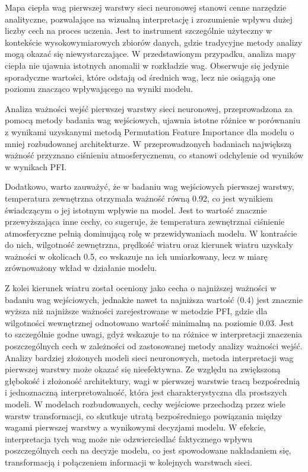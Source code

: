 \documentclass[a4paper,twoside,12pt]{book}
\begin{document}
Mapa ciepła wag pierwszej warstwy sieci neuronowej stanowi cenne narzędzie analityczne, pozwalające na wizualną interpretację i zrozumienie wpływu dużej liczby cech na proces uczenia. Jest to instrument szczególnie użyteczny w kontekście wysokowymiarowych zbiorów danych, gdzie tradycyjne metody analizy mogą okazać się niewystarczające. W przedstawionym przypadku, analiza mapy ciepła nie ujawnia istotnych anomalii w rozkładzie wag. Obserwuje się jedynie sporadyczne wartości, które odstają od średnich wag, lecz nie osiągają one poziomu znacząco wpływającego na wyniki modelu.

Analiza ważności wejść pierwszej warstwy sieci neuronowej, przeprowadzona za pomocą metody badania wag wejściowych, ujawnia istotne różnice w porównaniu z wynikami uzyskanymi metodą Permutation Feature Importance dla modelu o mniej rozbudowanej architekturze. W przeprowadzonych badaniach największą ważność przyznano ciśnieniu atmosferycznemu, co stanowi odchylenie od wyników w wynikach PFI.

Dodatkowo, warto zauważyć, że w badaniu wag wejściowych pierwszej warstwy, temperatura zewnętrzna otrzymała ważność równą 0.92, co jest wynikiem świadczącym o jej istotnym wpływie na model. Jest to wartość znacznie przewyższająca inne cechy, co sugeruje, że temperatura zewnętrznai ciśnienie atmosferyczne pełnią dominującą rolę w przewidywaniach modelu. W kontraście do nich, wilgotność zewnętrzna, prędkość wiatru oraz kierunek wiatru uzyskały ważności w okolicach 0.5, co wskazuje na ich umiarkowany, lecz w miarę zrównoważony wkład w działanie modelu.

Z kolei kierunek wiatru został oceniony jako cecha o najniższej ważności w badaniu wag wejściowych, jednakże nawet ta najniższa wartość (0.4) jest znacznie wyższa niż najniższe ważności zarejestrowane w metodzie PFI, gdzie dla wilgotności wewnętrznej odnotowano wartość minimalną na poziomie 0.03. Jest to szczególnie godne uwagi, gdyż wskazuje to na różnice w interpretacji znaczenia poszczególnych cech w zależności od zastosowanej metody analizy ważności wejść.\\

Analizy bardziej złożonych modeli sieci neuronowych, metoda interpretacji wag pierwszej warstwy może okazać się nieefektywna. Ze względu na zwiększoną głębokość i złożoność architektury, wagi w pierwszej warstwie tracą bezpośrednią i jednoznaczną interpretowalność, która jest charakterystyczna dla prostszych modeli. W modelach rozbudowanych, cechy wejściowe przechodzą przez wiele warstw transformacji, co skutkuje utratą bezpośredniego powiązania między wagami pierwszej warstwy a wynikowymi decyzjami modelu. W efekcie, interpretacja tych wag może nie odzwierciedlać faktycznego wpływu poszczególnych cech na decyzje modelu, co jest spowodowane nakładaniem się, transformacją i połączeniem informacji w kolejnych warstwach sieci.
\end{document}
